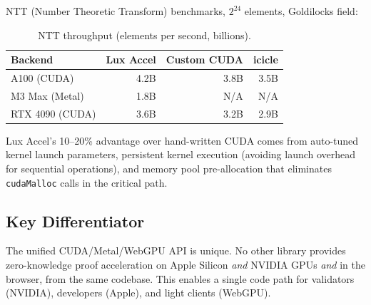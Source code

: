NTT (Number Theoretic Transform) benchmarks, $2^{24}$ elements, Goldilocks field:

\begin{table}[H]
\centering
\caption{NTT throughput (elements per second, billions).}
\footnotesize
\begin{tabular}{@{}lrrr@{}}
\toprule
Backend & Lux Accel & Custom CUDA & icicle \\
\midrule
A100 (CUDA) & 4.2B & 3.8B & 3.5B \\
M3 Max (Metal) & 1.8B & N/A & N/A \\
RTX 4090 (CUDA) & 3.6B & 3.2B & 2.9B \\
\bottomrule
\end{tabular}
\end{table}

Lux Accel's 10--20\% advantage over hand-written CUDA comes from auto-tuned kernel launch parameters, persistent kernel execution (avoiding launch overhead for sequential operations), and memory pool pre-allocation that eliminates \texttt{cudaMalloc} calls in the critical path.

\subsection{Key Differentiator}

The unified CUDA/Metal/WebGPU API is unique. No other library provides zero-knowledge proof acceleration on Apple Silicon \textit{and} NVIDIA GPUs \textit{and} in the browser, from the same codebase. This enables a single code path for validators (NVIDIA), developers (Apple), and light clients (WebGPU).

